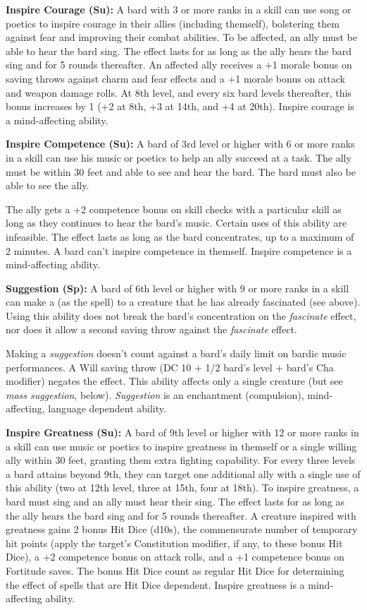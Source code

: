 \textbf{Inspire Courage (Su):} A bard with 3 or more ranks in a  skill can use song or poetics to inspire courage in their allies (including themself), bolstering them against fear and improving their combat abilities. To be affected, an ally must be able to hear the bard sing. The effect lasts for as long as the ally hears the bard sing and for 5 rounds thereafter. An affected ally receives a +1 morale bonus on saving throws against charm and fear effects and a +1 morale bonus on attack and weapon damage rolls. At 8th level, and every six bard levels thereafter, this bonus increases by 1 (+2 at 8th, +3 at 14th, and +4 at 20th). Inspire courage is a mind-affecting ability.

\textbf{Inspire Competence (Su):} A bard of 3rd level or higher with 6 or more ranks in a  skill can use his music or poetics to help an ally succeed at a task. The ally must be within 30 feet and able to see and hear the bard. The bard must also be able to see the ally.

The ally gets a +2 competence bonus on skill checks with a particular skill as long as they continues to hear the bard's music. Certain uses of this ability are infeasible. The effect lasts as long as the bard concentrates, up to a maximum of 2 minutes. A bard can't inspire competence in themself. Inspire competence is a mind-affecting ability.

\textbf{Suggestion (Sp):} A bard of 6th level or higher with 9 or more ranks in a  skill can make a  (as the spell) to a creature that he has already fascinated (see above). Using this ability does not break the bard's concentration on the \textit{fascinate} effect, nor does it allow a second saving throw against the \textit{fascinate} effect.

Making a \textit{suggestion} doesn't count against a bard's daily limit on bardic music performances. A Will saving throw (DC 10 + 1/2 bard's level + bard's Cha modifier) negates the effect. This ability affects only a single creature (but see \textit{mass suggestion}, below). \textit{Suggestion} is an enchantment (compulsion), mind-affecting, language dependent ability.

\textbf{Inspire Greatness (Su):} A bard of 9th level or higher with 12 or more ranks in a  skill can use music or poetics to inspire greatness in themself or a single willing ally within 30 feet, granting them extra fighting capability. For every three levels a bard attains beyond 9th, they can target one additional ally with a single use of this ability (two at 12th level, three at 15th, four at 18th). To inspire greatness, a bard must sing and an ally must hear their sing. The effect lasts for as long as the ally hears the bard sing and for 5 rounds thereafter. A creature inspired with greatness gains 2 bonus Hit Dice (d10s), the commensurate number of temporary hit points (apply the target's Constitution modifier, if any, to these bonus Hit Dice), a +2 competence bonus on attack rolls, and a +1 competence bonus on Fortitude saves. The bonus Hit Dice count as regular Hit Dice for determining the effect of spells that are Hit Dice dependent. Inspire greatness is a mind-affecting ability.

